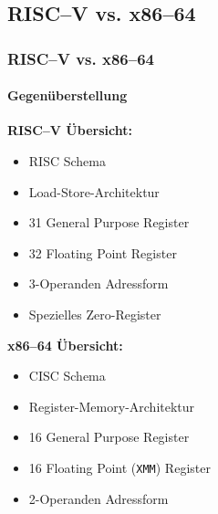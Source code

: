 \subsection{RISC--V vs. x86--64} %
\begin{frame}
    \frametitle{RISC--V vs. x86--64}
    \framesubtitle{Gegenüberstellung}

    \begin{minipage}[t]{.47\textwidth}
        \textbf{RISC--V Übersicht:}
        \vspace{0.20cm}
        \begin{itemize}
            \item RISC Schema
            \item Load-Store-Architektur
            \item 31 General Purpose Register
            \item 32 Floating Point Register
            \item 3-Operanden Adressform
            \item Spezielles Zero-Register
        \end{itemize}
    \end{minipage}
    \begin{minipage}[t]{.47\textwidth}
        \textbf{x86--64 Übersicht:}
        \vspace{0.20cm}
        \begin{itemize}
            \item CISC Schema
            \item Register-Memory-Architektur
            \item 16 General Purpose Register
            \item 16 Floating Point (\texttt{XMM}) Register
            \item 2-Operanden Adressform
        \end{itemize}
    \end{minipage}
\end{frame}

